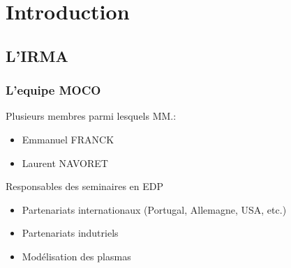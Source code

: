 
% 




\section{Introduction}    %

\subsection{L'IRMA}
	
\begin{frame}
\frametitle{L'equipe MOCO}
	Plusieurs membres parmi lesquels MM.: %
	\begin{itemize}
		\item Emmanuel FRANCK %
		\item Laurent NAVORET %
  \end{itemize}
  Responsables des seminaires en EDP

  \pause
	\begin{itemize}
		\item Partenariats internationaux (Portugal, Allemagne, USA, etc.)  %
		\item Partenariats indutriels  %
		\item Modélisation des plasmas  %
  \end{itemize}

\end{frame}

	
